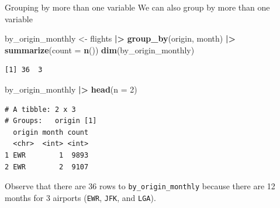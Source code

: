 \documentclass[
  ignorenonframetext,
]{beamer}
\newenvironment{Shaded}{\begin{snugshade}}{\end{snugshade}}
\newcommand{\AttributeTok}[1]{\textcolor[rgb]{0.13,0.29,0.53}{#1}}
\newcommand{\DecValTok}[1]{\textcolor[rgb]{0.00,0.00,0.81}{#1}}
\newcommand{\FunctionTok}[1]{\textcolor[rgb]{0.13,0.29,0.53}{\textbf{#1}}}
\newcommand{\NormalTok}[1]{#1}
\newcommand{\OtherTok}[1]{\textcolor[rgb]{0.56,0.35,0.01}{#1}}
\newcommand{\SpecialCharTok}[1]{\textcolor[rgb]{0.81,0.36,0.00}{\textbf{#1}}}
\begin{document}
\begin{frame}[fragile]{Grouping by more than one variable}
\protect\hypertarget{grouping-by-more-than-one-variable}{}
We can also group by more than one variable

\small

\begin{Shaded}
\begin{Highlighting}[]
\NormalTok{by\_origin\_monthly }\OtherTok{\textless{}{-}}\NormalTok{ flights }\SpecialCharTok{|\textgreater{}} 
  \FunctionTok{group\_by}\NormalTok{(origin, month) }\SpecialCharTok{|\textgreater{}} 
  \FunctionTok{summarize}\NormalTok{(}\AttributeTok{count =} \FunctionTok{n}\NormalTok{())}
\FunctionTok{dim}\NormalTok{(by\_origin\_monthly)}
\end{Highlighting}
\end{Shaded}

\begin{verbatim}
[1] 36  3
\end{verbatim}

\begin{Shaded}
\begin{Highlighting}[]
\NormalTok{by\_origin\_monthly }\SpecialCharTok{|\textgreater{}} \FunctionTok{head}\NormalTok{(}\AttributeTok{n =} \DecValTok{2}\NormalTok{)}
\end{Highlighting}
\end{Shaded}

\begin{verbatim}
# A tibble: 2 x 3
# Groups:   origin [1]
  origin month count
  <chr>  <int> <int>
1 EWR        1  9893
2 EWR        2  9107
\end{verbatim}

\normalsize

Observe that there are 36 rows to \texttt{by\_origin\_monthly} because
there are 12 months for 3 airports (\texttt{EWR}, \texttt{JFK}, and
\texttt{LGA}).
\end{frame}
\end{document}
